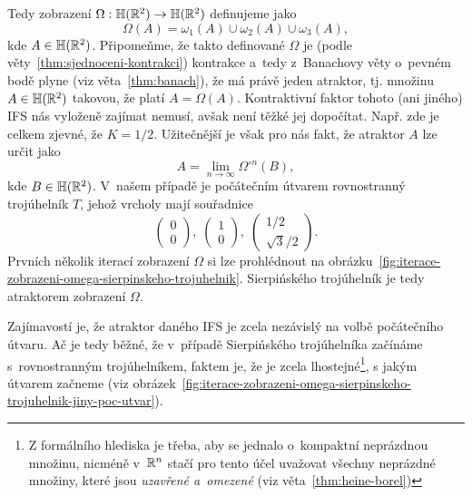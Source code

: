 Tedy zobrazení $\Omega:\mathbb{H}(\mathbb{R}^2) \rightarrow \mathbb{H}(\mathbb{R}^2)$ definujeme jako
\[\Omega(A)=\omega_1(A)\cup\omega_2(A)\cup\omega_3(A),\]
kde $A\in\mathbb{H}(\mathbb{R}^2)$. Připomeňme, že takto definované $\Omega$ je (podle věty~\ref{thm:sjednoceni-kontrakci}) kontrakce a~tedy z~Banachovy věty o~pevném bodě plyne (viz věta~\ref{thm:banach}), že má právě jeden atraktor, tj. množinu $A\in\mathbb{H}(\mathbb{R}^2)$ takovou, že platí $A=\Omega(A)$. Kontraktivní faktor tohoto (ani jiného) IFS nás vyloženě zajímat nemusí, avšak není těžké jej dopočítat. Např. zde je celkem zjevné, že $K=1/2$. Užitečnější je však pro nás fakt, že atraktor $A$ lze určit jako
\[A=\lim_{n\to\infty}\Omega^{\circ n}(B),\]
kde $B\in\mathbb{H}(\mathbb{R}^2)$. V~našem případě je počátečním útvarem rovnostranný trojúhelník $T$, jehož vrcholy mají souřadnice
\[\left(\begin{matrix}
    0\\
    0
\end{matrix}\right),\;\left(\begin{matrix}
    1\\
    0
\end{matrix}\right),\;\left(\begin{matrix}
    1/2\\
    \sqrt{3}/2
\end{matrix}\right).\]
Prvních několik iterací zobrazení $\Omega$ si lze prohlédnout na obrázku~\ref{fig:iterace-zobrazeni-omega-sierpinskeho-trojuhelnik}. Sierpińského trojúhelník je tedy atraktorem zobrazení $\Omega$.

Zajímavostí je, že atraktor daného IFS je zcela nezávislý na volbě počátečního útvaru. Ač je tedy běžné, že v~případě Sierpińského trojúhelníka začínáme s~rovnostranným trojúhelníkem, faktem je, že je zcela lhostejné\footnote{Z formálního hlediska je třeba, aby se jednalo o~kompaktní neprázdnou množinu, nicméně v~$\mathbb{R}^n$ stačí pro tento účel uvažovat všechny neprázdné množiny, které jsou \emph{uzavřené a~omezené} (viz věta~\ref{thm:heine-borel})}, s jakým útvarem začneme (viz obrázek~\ref{fig:iterace-zobrazeni-omega-sierpinskeho-trojuhelnik-jiny-poc-utvar}).

